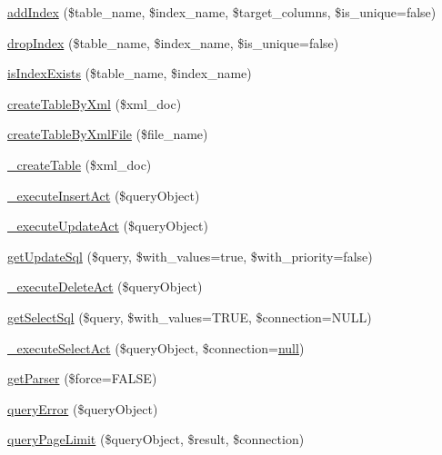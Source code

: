 \begin{DoxyCompactItemize}
\item 
\hyperlink{classDBMssql_a6202a3b8e96252f91ef104a854cf556c}{add\+Index} (\$table\+\_\+name, \$index\+\_\+name, \$target\+\_\+columns, \$is\+\_\+unique=false)
\item 
\hyperlink{classDBMssql_a83bea7f71705370699eac384c5f93088}{drop\+Index} (\$table\+\_\+name, \$index\+\_\+name, \$is\+\_\+unique=false)
\item 
\hyperlink{classDBMssql_a17723942b3686527a68b72a1740136c3}{is\+Index\+Exists} (\$table\+\_\+name, \$index\+\_\+name)
\item 
\hyperlink{classDBMssql_a7a3ff51c1a29e47c02f358dc6064d88b}{create\+Table\+By\+Xml} (\$xml\+\_\+doc)
\item 
\hyperlink{classDBMssql_ae136845dee2ecc1bd8fe3a7c535572f4}{create\+Table\+By\+Xml\+File} (\$file\+\_\+name)
\item 
\hyperlink{classDBMssql_a0705365081b34014652f440380c53519}{\+\_\+create\+Table} (\$xml\+\_\+doc)
\item 
\hyperlink{classDBMssql_aa3f04ce5bee8d9e11db7de7293055fef}{\+\_\+execute\+Insert\+Act} (\$query\+Object)
\item 
\hyperlink{classDBMssql_a855a8b1b61f7840ce057f72fa5a39300}{\+\_\+execute\+Update\+Act} (\$query\+Object)
\item 
\hyperlink{classDBMssql_a10dad79ab29a55301ef2327fb27f86aa}{get\+Update\+Sql} (\$query, \$with\+\_\+values=true, \$with\+\_\+priority=false)
\item 
\hyperlink{classDBMssql_a871bd07e7224b27daba828686ee57a8a}{\+\_\+execute\+Delete\+Act} (\$query\+Object)
\item 
\hyperlink{classDBMssql_a37ed6e799c12ecafdea33d6fb0a84f87}{get\+Select\+Sql} (\$query, \$with\+\_\+values=T\+R\+UE, \$connection=N\+U\+LL)
\item 
\hyperlink{classDBMssql_a819a9181e9f34ce00f6f2d8a273813a6}{\+\_\+execute\+Select\+Act} (\$query\+Object, \$connection=\hyperlink{modernizr_8min_8js_a286f9ec831c5e676eeb493248eab9575}{null})
\item 
\hyperlink{classDBMssql_aa67e4dcd0df911a7c4e6325f21f0fb04}{get\+Parser} (\$force=F\+A\+L\+SE)
\item 
\hyperlink{classDBMssql_adeea6fd6090140a4b81051c5ff68cdfe}{query\+Error} (\$query\+Object)
\item 
\hyperlink{classDBMssql_a5a63ce969c396b656ac50e2251e798b9}{query\+Page\+Limit} (\$query\+Object, \$result, \$connection)
\end{DoxyCompactItemize}
